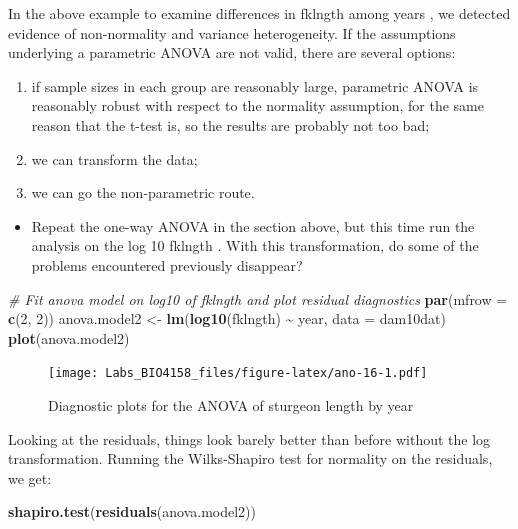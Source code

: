 \documentclass[
  12pt,
]{book}
\newenvironment{Shaded}{\begin{snugshade}}{\end{snugshade}}
\newcommand{\CommentTok}[1]{\textcolor[rgb]{0.56,0.35,0.01}{\textit{#1}}}
\newcommand{\DataTypeTok}[1]{\textcolor[rgb]{0.13,0.29,0.53}{#1}}
\newcommand{\DecValTok}[1]{\textcolor[rgb]{0.00,0.00,0.81}{#1}}
\newcommand{\KeywordTok}[1]{\textcolor[rgb]{0.13,0.29,0.53}{\textbf{#1}}}
\newcommand{\NormalTok}[1]{#1}
\newcommand{\OperatorTok}[1]{\textcolor[rgb]{0.81,0.36,0.00}{\textbf{#1}}}
\newcommand{\StringTok}[1]{\textcolor[rgb]{0.31,0.60,0.02}{#1}}
\providecommand{\tightlist}{%
  \setlength{\itemsep}{0pt}\setlength{\parskip}{0pt}}
\begin{document}
In the above example to examine differences in fklngth among years , we detected evidence of non-normality and variance heterogeneity. If the assumptions underlying a parametric ANOVA are not valid, there are several options:

\begin{enumerate}
\def\labelenumi{\arabic{enumi}.}
\tightlist
\item
  if sample sizes in each group are reasonably large, parametric ANOVA is reasonably robust with respect to the normality assumption, for the same reason that the t-test is, so the results are probably not too bad;
\item
  we can transform the data;
\item
  we can go the non-parametric route.
\end{enumerate}

\begin{itemize}
\tightlist
\item
  Repeat the one-way ANOVA in the section above, but this time run the analysis on the log 10 fklngth . With this transformation, do some of the problems encountered previously disappear?
\end{itemize}

\begin{Shaded}
\begin{Highlighting}[]
\CommentTok{\# Fit anova model on log10 of fklngth and plot residual diagnostics}
\KeywordTok{par}\NormalTok{(}\DataTypeTok{mfrow =} \KeywordTok{c}\NormalTok{(}\DecValTok{2}\NormalTok{, }\DecValTok{2}\NormalTok{))}
\NormalTok{anova.model2 \textless{}{-}}\StringTok{ }\KeywordTok{lm}\NormalTok{(}\KeywordTok{log10}\NormalTok{(fklngth) }\OperatorTok{\textasciitilde{}}\StringTok{ }\NormalTok{year, }\DataTypeTok{data =}\NormalTok{ dam10dat)}
\KeywordTok{plot}\NormalTok{(anova.model2)}
\end{Highlighting}
\end{Shaded}

\begin{figure}
\centering
\texttt{[image: Labs\_BIO4158\_files/figure-latex/ano-16-1.pdf]}
\caption{\label{fig:ano-16}Diagnostic plots for the ANOVA of sturgeon length by year}
\end{figure}

Looking at the residuals, things look barely better than before without the log transformation. Running the Wilks-Shapiro
test for normality on the residuals, we get:

\begin{Shaded}
\begin{Highlighting}[]
\KeywordTok{shapiro.test}\NormalTok{(}\KeywordTok{residuals}\NormalTok{(anova.model2))}
\end{Highlighting}
\end{Shaded}
\end{document}
